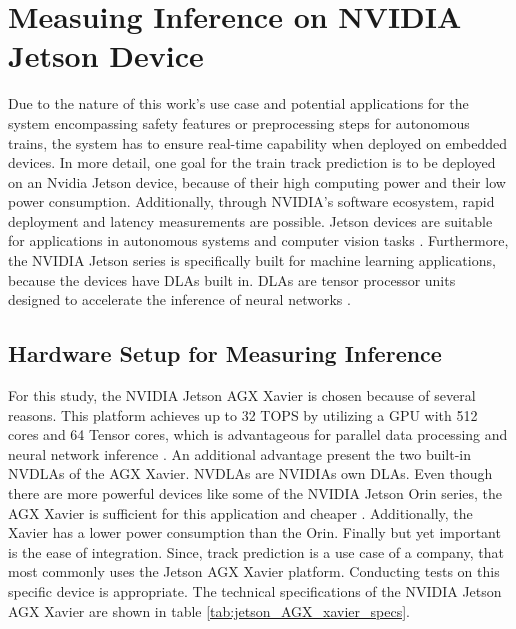 \section{Measuing Inference on NVIDIA Jetson Device}
\label{sec:measuringInference}

Due to the nature of this work's use case and potential applications for the system encompassing safety features or preprocessing steps for autonomous trains, the system has to ensure real-time capability when deployed on embedded devices. 
In more detail, one goal for the train track prediction is to be deployed on an Nvidia Jetson device, because of their high computing power and their low power consumption.
Additionally, through NVIDIA's software ecosystem, rapid deployment and latency measurements are possible.
Jetson devices are suitable for applications in autonomous systems and computer vision tasks \cite{nvidia_jetson_embedded_devices}.
Furthermore, the NVIDIA Jetson series is specifically built for machine learning applications, because the devices have \ac{DLA}s built in.
\ac{DLA}s are tensor processor units designed to accelerate the inference of neural networks \cite{nvidia_dlas}.

\subsection{Hardware Setup for Measuring Inference}

For this study, the NVIDIA Jetson AGX Xavier is chosen because of several reasons.
This platform achieves up to 32 TOPS by utilizing a \ac{GPU} with 512 cores and 64 Tensor cores, which is advantageous for parallel data processing and neural network inference \cite{nvidia_jetson_agx_xavier_datasheet}.
An additional advantage present the two built-in \ac{NVDLA}s of the AGX Xavier.
\ac{NVDLA}s are NVIDIAs own \ac{DLA}s.
Even though there are more powerful devices like some of the NVIDIA Jetson Orin series, the AGX Xavier is sufficient for this application and cheaper \cite{nvidia_jetson_embedded_devices_prices}.
Additionally, the Xavier has a lower power consumption than the Orin.
Finally but yet important is the ease of integration.
Since, track prediction is a use case of a company, that most commonly uses the Jetson AGX Xavier platform.
Conducting tests on this specific device is appropriate.
The technical specifications of the NVIDIA Jetson AGX Xavier are shown in table \ref{tab:jetson_AGX_xavier_specs}.

